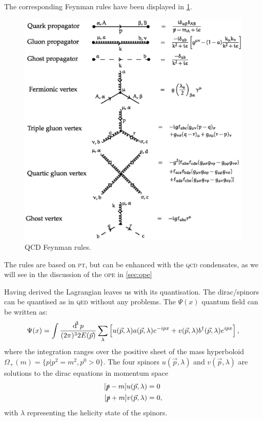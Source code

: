 \documentclass[../../index.tex]{subfiles}
\begin{document}
The corresponding Feynman rules have been displayed in
\cref{fig:qcdFeynmanRules}.
\begin{figure}
  \includegraphics[width=\textwidth]{./images/qcdFeynmanRules.eps}
  \caption{QCD Feynman rules.}
  \label{fig:qcdFeynmanRules}
\end{figure}
The rules are based on \textsc{pt}, but can be enhanced with the \textsc{qcd}
condensates, as we will see in the discussion of the \textsc{ope} in
\cref{sec:ope}

Having derived the Lagrangian leaves us with its quantisation. The
dirac\-/spinors can be quantised as in \textsc{qed} without any problems. The
$\Psi(x)$ quantum field can be written as:
\begin{equation}
  \Psi(x) = \int \frac{\dif^3 p}{(2\pi)^3 2E(\vec p)} \sum_\lambda \left[ u(\vec p, \lambda) a(\vec p, \lambda) e^{-ipx} + v(\vec p, \lambda) b^\dagger (\vec p, \lambda) e^{ipx} \right],
\end{equation}
where the integration ranges over the positive sheet of the mass hyperboloid
$\Omega_+(m) = \{p \vert p^2 = m^2, p^0 > 0 \}$. The four spinors $u(\vec p,
\lambda)$ and $v(\vec p, \lambda)$ are solutions to the dirac equations in
momentum space
\begin{equation}
  \begin{split}
    [\slashed p - m]u(\vec p, \lambda) &= 0 \\
    [\slashed p + m]v(\vec p, \lambda) &= 0,
  \end{split}
\end{equation}
with $\lambda$ representing the helicity state of the spinors.
\end{document}

